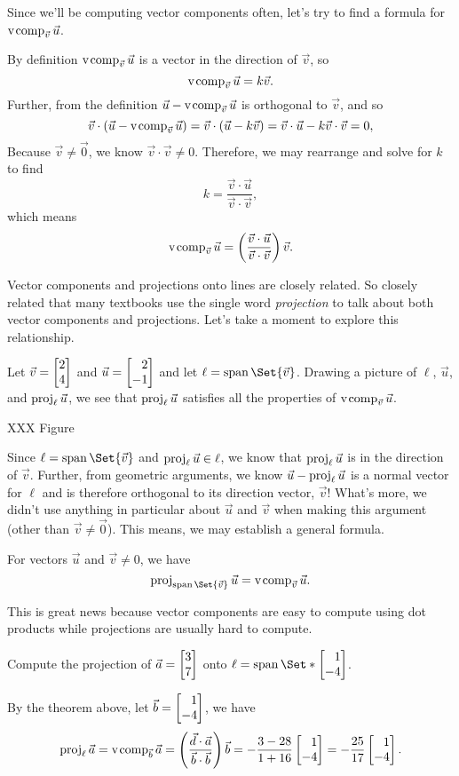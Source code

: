 Since we'll be computing vector components often, let's try to find a formula for $\operatorname{v\hspace{1pt}comp}_{\vec v}\vec u$.

By definition $\operatorname{v\hspace{1pt}comp}_{\vec v}\vec u$ is a vector in the direction of $\vec v$, so
\[
	\operatorname{v\hspace{1pt}comp}_{\vec v}\vec u = k\vec v.
\]
Further, from the definition $\vec u-\operatorname{v\hspace{1pt}comp}_{\vec v}\vec u$ is orthogonal to $\vec v$, and so
\[
	\vec v\cdot (\vec u-\operatorname{v\hspace{1pt}comp}_{\vec v}\vec u) = \vec v\cdot (\vec u-k\vec v)=\vec v\cdot \vec u-k\vec v\cdot \vec v=0,
\]
Because $\vec v\neq \vec 0$, we know $\vec v\cdot \vec v\neq 0$. Therefore, we may rearrange and solve for $k$ to find
\[
	k=\frac{\vec v\cdot \vec u}{\vec v\cdot \vec v},
\]
which means
\[
	\operatorname{v\hspace{1pt}comp}_{\vec v}\vec u = \left(\frac{\vec v\cdot \vec u}{\vec v\cdot \vec v}\right)\vec v.
\]


Vector components and projections onto lines are closely related. So closely related that many textbooks
use the single word \emph{projection} to talk about both vector components and projections. Let's take a moment
to explore this relationship.

Let $\vec v=\mat{2\\4}$ and $\vec u=\mat{2\\-1}$ and let $\ell=\Span\Set{\vec v}$. Drawing a picture of
$\ell$, $\vec u$, and $\operatorname{proj}_\ell\vec u$, we see that $\operatorname{proj}_\ell\vec u$ satisfies all the properties
of $\operatorname{v\hspace{1pt}comp}_{\vec v}\vec u$.

XXX Figure

Since $\ell=\Span\Set{\vec v}$ and $\operatorname{proj}_\ell\vec u\in\ell$, we know that $\operatorname{proj}_\ell\vec u$ is in the direction
of $\vec v$. Further, from geometric arguments, we know $\vec u-\operatorname{proj}_\ell\vec u$ is a normal vector for $\ell$
and is therefore orthogonal to its direction vector, $\vec v$! What's more, we didn't
use anything in particular about $\vec u$ and $\vec v$ when making this argument (other than $\vec v\neq \vec 0$). This means,
we may establish a general formula. 

\begin{theorem}
	For vectors $\vec u$ and $\vec v\neq 0$, we have
	\[
		\Proj_{\Span\Set{\vec v}}\vec u=\Vcomp_{\vec v}\vec u.
	\]
\end{theorem}

This is great news because vector components are easy to compute using dot products while projections are usually hard to compute.

\begin{example}
	Compute the projection of $\vec a=\mat{3\\7}$ onto $\ell=\Span\Set*{\mat{1\\-4}}$.

	By the theorem above, let $\vec b = \mat{1\\-4}$, we have
	\[
	    \Proj_\ell \vec a = \Vcomp_{\vec b} \vec a = \left(\frac{\vec d\cdot \vec a}{\vec b\cdot \vec b}\right)\vec b = -\frac{3-28}{1+16}\mat{1\\-4}=-\frac{25}{17}\mat{1\\-4}.
	\]
\end{example}

